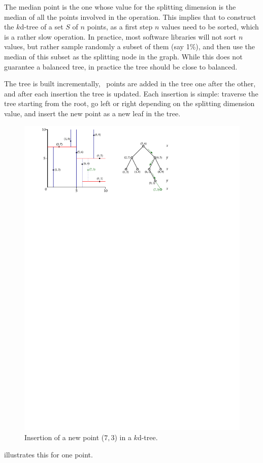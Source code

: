 The median point is the one whose value for the splitting dimension is the median of all the points involved in the operation.
This implies that to construct the $k$d-tree of a set $S$ of $n$ points, as a first step $n$ values need to be sorted, which is a rather slow operation.
In practice, most software libraries will not sort $n$ values, but rather sample randomly a subset of them (say 1\%), and then use the median of this subset as the splitting node in the graph.
While this does not guarantee a balanced tree, in practice the tree should be close to balanced.

The tree is built incrementally, \ie\ points are added in the tree one after the other, and after each insertion the tree is updated.
Each insertion is simple: traverse the tree starting from the root, go left or right depending on the splitting dimension value, and insert the new point as a new leaf in the tree.
\begin{figure}[tbp]
  \centering
  \includegraphics[width=0.9\linewidth]{figs/kdtree_insert}
  \caption{Insertion of a new point ($7,3$) in a $k$d-tree.}%
\end{figure} 
illustrates this for one point.

